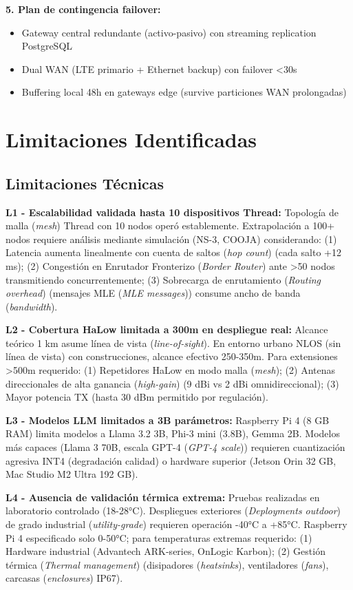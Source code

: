 \textbf{5. Plan de contingencia failover:}
\begin{itemize}
\item Gateway central redundante (activo-pasivo) con streaming replication PostgreSQL
\item Dual WAN (LTE primario + Ethernet backup) con failover <30s
\item Buffering local 48h en gateways edge (survive particiones WAN prolongadas)
\end{itemize}

\section{Limitaciones Identificadas}

\subsection{Limitaciones Técnicas}

\textbf{L1 - Escalabilidad validada hasta 10 dispositivos Thread:} Topología de malla (\textit{mesh}) Thread con 10 nodos operó establemente. Extrapolación a 100+ nodos requiere análisis mediante simulación (NS-3, COOJA) considerando: (1) Latencia aumenta linealmente con cuenta de saltos (\textit{hop count}) (cada salto +12 ms); (2) Congestión en Enrutador Fronterizo (\textit{Border Router}) ante >50 nodos transmitiendo concurrentemente; (3) Sobrecarga de enrutamiento (\textit{Routing overhead}) (mensajes MLE (\textit{MLE messages})) consume ancho de banda (\textit{bandwidth}).

\textbf{L2 - Cobertura HaLow limitada a 300m en despliegue real:} Alcance teórico 1 km asume línea de vista (\textit{line-of-sight}). En entorno urbano NLOS (sin línea de vista) con construcciones, alcance efectivo 250-350m. Para extensiones >500m requerido: (1) Repetidores HaLow en modo malla (\textit{mesh}); (2) Antenas direccionales de alta ganancia (\textit{high-gain}) (9 dBi vs 2 dBi omnidireccional); (3) Mayor potencia TX (hasta 30 dBm permitido por regulación).

\textbf{L3 - Modelos LLM limitados a 3B parámetros:} Raspberry Pi 4 (8 GB RAM) limita modelos a Llama 3.2 3B, Phi-3 mini (3.8B), Gemma 2B. Modelos más capaces (Llama 3 70B, escala GPT-4 (\textit{GPT-4 scale})) requieren cuantización agresiva INT4 (degradación calidad) o hardware superior (Jetson Orin 32 GB, Mac Studio M2 Ultra 192 GB).

\textbf{L4 - Ausencia de validación térmica extrema:} Pruebas realizadas en laboratorio controlado (18-28°C). Despliegues exteriores (\textit{Deployments outdoor}) de grado industrial (\textit{utility-grade}) requieren operación -40°C a +85°C. Raspberry Pi 4 especificado solo 0-50°C; para temperaturas extremas requerido: (1) Hardware industrial (Advantech ARK-series, OnLogic Karbon); (2) Gestión térmica (\textit{Thermal management}) (disipadores (\textit{heatsinks}), ventiladores (\textit{fans}), carcasas (\textit{enclosures}) IP67).

